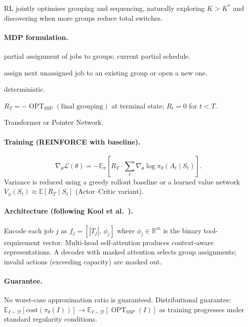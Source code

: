 \documentclass[11pt,a4paper]{article}
\theoremstyle{plain}
\theoremstyle{definition}
\DeclareMathOperator{\OPT}{OPT}
\newcommand{\Kstar}{K^{*}}          %
\begin{document}
RL jointly optimises grouping and sequencing, naturally exploring $K > \Kstar$ and
discovering when more groups reduce total switches.

\paragraph{MDP formulation.}
\begin{description}[leftmargin=*]
  \item[State $S_t$:] partial assignment of jobs to groups; current partial schedule.
  \item[Action $A_t$:] assign next unassigned job to an existing group or open a new one.
  \item[Transition:] deterministic.
  \item[Reward:] $R_T = -\OPT_{\text{SSP}}(\text{final grouping})$ at terminal state;
    $R_t = 0$ for $t < T$.
  \item[Policy $\pi_\theta$:] Transformer or Pointer Network.
\end{description}

\paragraph{Training (REINFORCE with baseline).}
\[
  \nabla_\theta \mathcal{L}(\theta)
  = -\mathbb{E}_{\pi}\!\left[R_T \cdot \sum_t \nabla_\theta \log \pi_\theta(A_t \mid S_t)\right].
\]
Variance is reduced using a greedy rollout baseline or a learned value network
$V_\phi(S_t) \approx \mathbb{E}[R_T \mid S_t]$ (Actor--Critic variant).

\paragraph{Architecture (following Kool et al.\ \cite{Kool2019}).}
Encode each job $j$ as $f_j = [|T_j|,\, \phi_j]$ where $\phi_j \in \mathbb{R}^m$
is the binary tool-requirement vector.
Multi-head self-attention produces context-aware representations.
A decoder with masked attention selects group assignments;
invalid actions (exceeding capacity) are masked out.

\paragraph{Guarantee.}
No worst-case approximation ratio is guaranteed.
Distributional guarantee: $\mathbb{E}_{I \sim \mathcal{D}}[\text{cost}(\pi_\theta(I))]
\to \mathbb{E}_{I \sim \mathcal{D}}[\OPT_{\text{SSP}}(I)]$ as training progresses under
standard regularity conditions.
\end{document}
